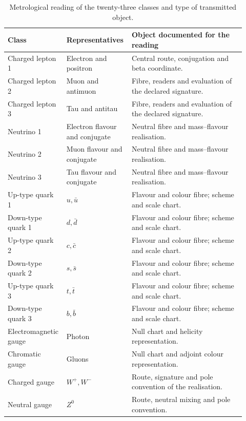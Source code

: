 \begingroup
\small
\setlength{\tabcolsep}{3pt}
\begin{table}[!htbp]
\centering\fontsize{9.2}{10.6}\selectfont\renewcommand{\arraystretch}{1.04}
\caption{Metrological reading of the twenty-three classes and type of transmitted object.}
\label{tab:vi-clases-metrologia}
\begin{tabular}{p{0.20\linewidth}p{0.25\linewidth}p{0.47\linewidth}}
\toprule
Class & Representatives & Object documented for the reading\\
\midrule

Charged lepton 1 & Electron and positron & Central route, conjugation and beta coordinate.\\
Charged lepton 2 & Muon and antimuon & Fibre, readers and evaluation of the declared signature.\\
Charged lepton 3 & Tau and antitau & Fibre, readers and evaluation of the declared signature.\\
Neutrino 1 & Electron flavour and conjugate & Neutral fibre and mass--flavour realisation.\\
Neutrino 2 & Muon flavour and conjugate & Neutral fibre and mass--flavour realisation.\\
Neutrino 3 & Tau flavour and conjugate & Neutral fibre and mass--flavour realisation.\\
Up-type quark 1 & \(u,\bar u\) & Flavour and colour fibre; scheme and scale chart.\\
Down-type quark 1 & \(d,\bar d\) & Flavour and colour fibre; scheme and scale chart.\\
Up-type quark 2 & \(c,\bar c\) & Flavour and colour fibre; scheme and scale chart.\\
Down-type quark 2 & \(s,\bar s\) & Flavour and colour fibre; scheme and scale chart.\\
Up-type quark 3 & \(t,\bar t\) & Flavour and colour fibre; scheme and scale chart.\\
Down-type quark 3 & \(b,\bar b\) & Flavour and colour fibre; scheme and scale chart.\\
Electromagnetic gauge & Photon & Null chart and helicity representation.\\
Chromatic gauge & Gluons & Null chart and adjoint colour representation.\\
Charged gauge & \(W^+,W^-\) & Route, signature and pole convention of the realisation.\\
Neutral gauge & \(Z^0\) & Route, neutral mixing and pole convention.\\

\end{tabular}
\end{table}
